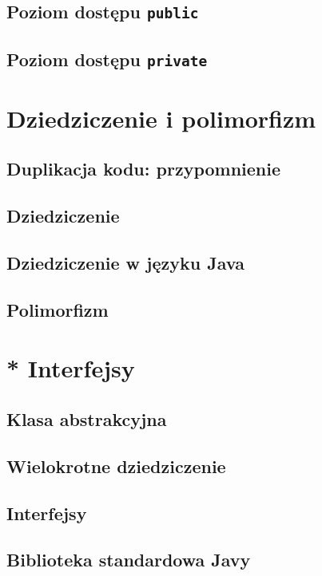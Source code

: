 \documentclass[11pt]{book}
\begin{document}
\section{Poziom dostępu \texttt{public}}
\section{Poziom dostępu \texttt{private}}

\chapter{Dziedziczenie i polimorfizm}
\section{Duplikacja kodu: przypomnienie}
\section{Dziedziczenie}
\section{Dziedziczenie w języku Java}
\section{Polimorfizm}

\chapter{* Interfejsy}
\section{Klasa abstrakcyjna}
\section{Wielokrotne dziedziczenie}
\section{Interfejsy}
\section{Biblioteka standardowa Javy}
\end{document}
